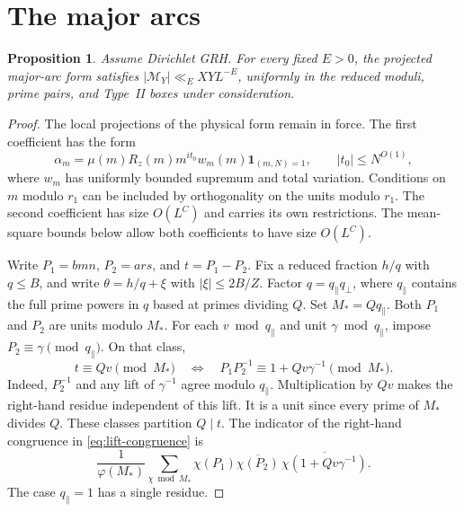 \documentclass[11pt]{amsart}
\numberwithin{equation}{section}
\newtheorem{proposition}[theorem]{Proposition}
\theoremstyle{remark}
\begin{document}
\section{The major arcs}\label{sec:major-arcs}

\begin{proposition}\label{prop:major-arcs}
Assume Dirichlet GRH. For every fixed $E>0$, the projected major-arc
form satisfies $|\mathcal M_Y|\ll_E XYL^{-E}$, uniformly in the
reduced moduli, prime pairs, and Type~II boxes under consideration.
\end{proposition}

\begin{proof}
The local projections of the physical form remain in force. The first
coefficient has the form
\[
 \alpha_m=\mu(m)R_z(m)m^{it_0}w_m(m)\mathbf1_{(m,N)=1},
 \qquad |t_0|\leq N^{O(1)},
\]
where $w_m$ has uniformly bounded supremum and total variation.
Conditions on $m$ modulo $r_1$ can be included by orthogonality on
the units modulo $r_1$. The second coefficient has size $O(L^C)$ and
carries its own restrictions. The mean-square bounds below allow
both coefficients to have size $O(L^C)$.

Write $P_1=bmn$, $P_2=ars$, and $t=P_1-P_2$. Fix a reduced fraction
$h/q$ with $q\leq B$, and write $\theta=h/q+\xi$ with
$|\xi|\leq 2B/Z$. Factor $q=q_\parallel q_\perp$, where $q_\parallel$
contains the full prime powers in $q$ based at primes dividing $Q$.
Set $M_*=Qq_\parallel$. Both $P_1$ and $P_2$ are units modulo $M_*$.
For each $v\bmod q_\parallel$ and unit $\gamma\bmod q_\parallel$, impose
$P_2\equiv\gamma\pmod{q_\parallel}$. On that class,
\begin{equation}\label{eq:lift-congruence}
 t\equiv Qv\pmod{M_*}
 \quad\Longleftrightarrow\quad
 P_1P_2^{-1}\equiv 1+Qv\gamma^{-1}\pmod{M_*}.
\end{equation}
Indeed, $P_2^{-1}$ and any lift of $\gamma^{-1}$ agree modulo
$q_\parallel$. Multiplication by $Qv$ makes the right-hand residue
independent of this lift. It is a unit since every prime of $M_*$
divides $Q$. These classes partition $Q\mid t$. The indicator of
the right-hand congruence in \eqref{eq:lift-congruence} is
\begin{equation}\label{eq:lift-character}
 \frac{1}{\varphi(M_*)}\sum_{\chi\bmod M_*}
 \chi(P_1)\overline{\chi(P_2)}
 \,\overline{\chi(1+Qv\gamma^{-1})}.
\end{equation}
The case $q_\parallel=1$ has a single residue.


\end{proof}
\end{document}
